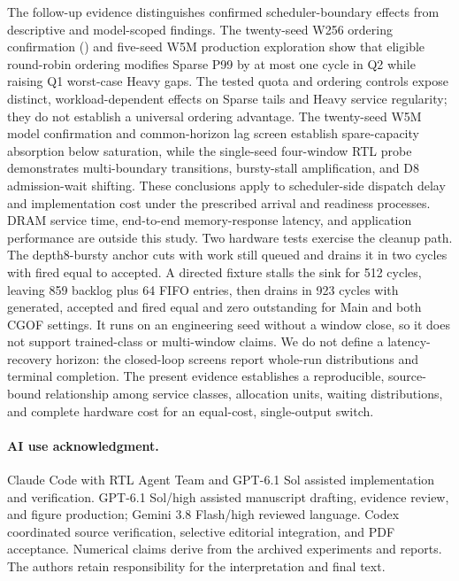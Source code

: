 The follow-up evidence distinguishes confirmed scheduler-boundary effects from descriptive and model-scoped findings. The twenty-seed W256 ordering confirmation () and five-seed W5M production exploration show that eligible round-robin ordering modifies Sparse P99 by at most one cycle in Q2 while raising Q1 worst-case Heavy gaps. The tested quota and ordering controls expose distinct, workload-dependent effects on Sparse tails and Heavy service regularity; they do not establish a universal ordering advantage. The twenty-seed W5M model confirmation and common-horizon lag screen establish spare-capacity absorption below saturation, while the single-seed four-window RTL probe demonstrates multi-boundary transitions, bursty-stall amplification, and D8 admission-wait shifting. These conclusions apply to scheduler-side dispatch delay and implementation cost under the prescribed arrival and readiness processes. DRAM service time, end-to-end memory-response latency, and application performance are outside this study. Two hardware tests exercise the cleanup path. The depth8-bursty anchor cuts with work still queued and drains it in two cycles with fired equal to accepted. A directed fixture stalls the sink for 512 cycles, leaving 859 backlog plus 64 FIFO entries, then drains in 923 cycles with generated, accepted and fired equal and zero outstanding for Main and both CGOF settings. It runs on an engineering seed without a window close, so it does not support trained-class or multi-window claims. We do not define a latency-recovery horizon: the closed-loop screens report whole-run distributions and terminal completion. The present evidence establishes a reproducible, source-bound relationship among service classes, allocation units, waiting distributions, and complete hardware cost for an equal-cost, single-output switch.

\paragraph{AI use acknowledgment.}
Claude Code with RTL Agent Team and GPT-6.1 Sol assisted implementation and verification. GPT-6.1 Sol/high assisted manuscript drafting, evidence review, and figure production; Gemini 3.8 Flash/high reviewed language. Codex coordinated source verification, selective editorial integration, and PDF acceptance. Numerical claims derive from the archived experiments and reports. The authors retain responsibility for the interpretation and final text.
